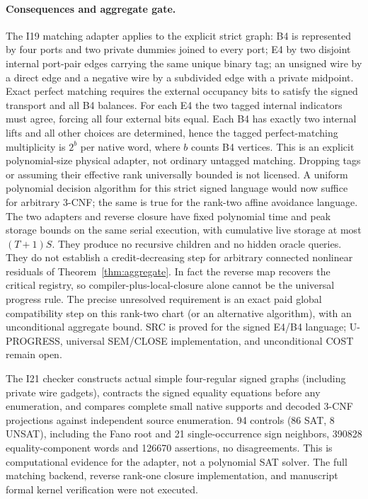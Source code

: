 \documentclass[11pt]{article}
\begin{document}
\paragraph{Consequences and aggregate gate.}
The I19 matching adapter applies to the explicit strict graph: B4 is represented by four ports and two private dummies joined to every port; E4 by two disjoint internal port-pair edges carrying the same unique binary tag; an unsigned wire by a direct edge and a negative wire by a subdivided edge with a private midpoint. Exact perfect matching requires the external occupancy bits to satisfy the signed transport and all B4 balances. For each E4 the two tagged internal indicators must agree, forcing all four external bits equal. Each B4 has exactly two internal lifts and all other choices are determined, hence the tagged perfect-matching multiplicity is $2^b$ per native word, where $b$ counts B4 vertices. This is an explicit polynomial-size physical adapter, not ordinary untagged matching. Dropping tags or assuming their effective rank universally bounded is not licensed. A uniform polynomial decision algorithm for this strict signed language would now suffice for arbitrary 3-CNF; the same is true for the rank-two affine avoidance language. The two adapters and reverse closure have fixed polynomial time and peak storage bounds on the same serial execution, with cumulative live storage at most $(T+1)S$. They produce no recursive children and no hidden oracle queries. They do not establish a credit-decreasing step for arbitrary connected nonlinear residuals of Theorem~\ref{thm:aggregate}. In fact the reverse map recovers the critical registry, so compiler-plus-local-closure alone cannot be the universal progress rule. The precise unresolved requirement is an exact paid global compatibility step on this rank-two chart (or an alternative algorithm), with an unconditional aggregate bound. SRC is proved for the signed E4/B4 language; U-PROGRESS, universal SEM/CLOSE implementation, and unconditional COST remain open.

The I21 checker constructs actual simple four-regular signed graphs (including private wire gadgets), contracts the signed equality equations before any enumeration, and compares complete small native supports and decoded 3-CNF projections against independent source enumeration. 94 controls (86 SAT, 8 UNSAT), including the Fano root and 21 single-occurrence sign neighbors, 390828 equality-component words and 126670 assertions, no disagreements. This is computational evidence for the adapter, not a polynomial SAT solver. The full matching backend, reverse rank-one closure implementation, and manuscript formal kernel verification were not executed.
\end{document}

